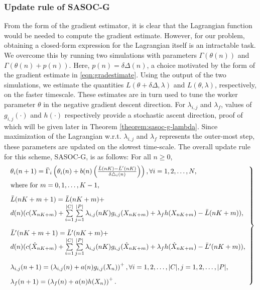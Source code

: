 \documentclass[11pt,letterpaper,english]{article}
\begin{document}
\subsubsection{Update rule of SASOC-G}
From the form of the gradient estimator, it is clear that the Lagrangian function would be needed to compute the gradient estimate. However, for our problem, obtaining a closed-form expression for the Lagrangian itself is an intractable task.
We overcome this by running two simulations with parameters $\Gamma(\theta(n))$ and $\Gamma(\theta(n) + p(n))$. Here, $p(n) = \delta \Delta(n)$, a choice motivated by the form of the gradient estimate in \eqref{eqn:gradestimate}. Using the output of the two simulations, we estimate the quantities $L(\theta + \delta \Delta, \lambda)$ and $L(\theta, \lambda)$, respectively, on the faster timescale. These estimates are in turn used to tune the worker parameter $\theta$ in the negative gradient descent direction. For $\lambda_{i, j}$ and $\lambda_f$, values of $g_{i,j}(\cdot)$ and $h(\cdot)$ respectively provide a stochastic ascent direction, proof of which will be given later in Theorem \ref{theorem:sasoc-g-lambda}. Since maximization of the Lagrangian w.r.t. $\lambda_{i, j}$ and $\lambda_f$ represents the outer-most step, these parameters are updated on the slowest time-scale. The overall update rule for this scheme, SASOC-G, is as follows: For all $n \ge 0$,
\begin{equation}
\label{eqn:spsa-update-rule}
\left .\scalebox{0.96}{$\begin{array}{l}
\theta_{i}(n+1)  =  \bar\Gamma_i \left( \theta_{i}(n) + b(n)
\left(\frac{\bar{L}(nK) - \bar{L}'(nK)}{\delta \triangle_{i}(n)}
\right) \right),\forall i = 1, 2, \dots, N,\\[2ex]
\text{where for $m=0,1,\ldots,K-1$,}\\[2ex]
\bar{L}(nK+m+1) = \bar{L}(nK+m) + \\
d(n)(c(X_{nK+m}) + \sum\limits_{i=1}^{|C|}\sum\limits_{j=1}^{|P|} \lambda_{i,j}(nK) g_{i,j}(X_{nK+m}) + \lambda_f h(X_{nK+m}) - \bar{L}(nK+m) ), \\[4ex]
\bar{L}'(nK+m+1) = \bar{L}'(nK+m) + \\
d(n)(c(\hat{X}_{nK+m}) + \sum\limits_{i=1}^{|C|}\sum\limits_{j=1}^{|P|} \lambda_{i,j}(nK) g_{i,j}(\hat{X}_{nK+m}) + \lambda_f h(\hat{X}_{nK+m}) - \bar{L}'(nK+m) ),  \\[4ex]
\lambda_{i,j}(n+1) = \left( \lambda_{i,j}(n) + a(n)g_{i,j}(X_n) \right)^{+}, \forall i = 1, 2, \dots, |C|, j = 1, 2, \dots, |P|, \\[2ex]
\lambda_f(n+1) = \left( \lambda_f(n) + a(n)h(X_n) \right)^{+}.
\end{array}$} \right \}
\end{equation}
\end{document}
